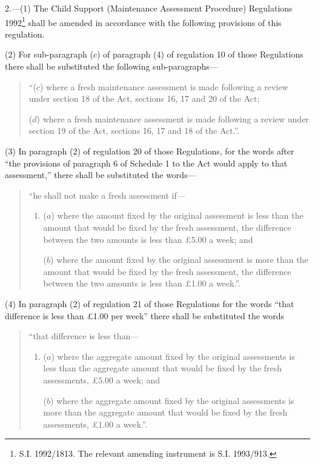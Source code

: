 \documentclass[12pt,a4paper]{article}
\begin{document}
2.—(1) The Child Support (Maintenance Assessment Procedure) Regulations 1992\footnote{\frenchspacing S.I. 1992/1813. The relevant amending instrument is S.I. 1993/913.} shall be amended in accordance with the following provisions of this regulation.

(2) For sub-paragraph ($c$) of paragraph (4) of regulation 10 of those Regulations there shall be substituted the following sub-paragraphs—
\begin{quotation}
“($c$) where a fresh maintenance assessment is made following a review under section 18 of the Act, sections 16, 17 and 20 of the Act;

($d$) where a fresh maintenance assessment is made following a review under section 19 of the Act, sections 16, 17 and 18 of the Act.”.
\end{quotation}

(3) In paragraph (2) of regulation 20 of those Regulations, for the words after “the provisions of paragraph 6 of Schedule 1 to the Act would apply to that assessment,” there shall be substituted the words—
\begin{quotation}
“he shall not make a fresh assessment if—
\begin{enumerate}\item[]
($a$) where the amount fixed by the original assessment is less than the amount that would be fixed by the fresh assessment, the difference between the two amounts is less than £5.00 a week; and

($b$) where the amount fixed by the original assessment is more than the amount that would be fixed by the fresh assessment, the difference between the two amounts is less than £1.00 a week.”.
\end{enumerate}
\end{quotation}

(4) In paragraph (2) of regulation 21 of those Regulations for the words “that difference is less than £1.00 per week” there shall be substituted the words
\begin{quotation}
“that difference is less than—
\begin{enumerate}\item[]
($a$) where the aggregate amount fixed by the original assessments is less than the aggregate amount that would be fixed by the fresh assessments, £5.00 a week; and

($b$) where the aggregate amount fixed by the original assessments is more than the aggregate amount that would be fixed by the fresh assessments, £1.00 a week.”.
\end{enumerate}
\end{quotation}
\end{document}
